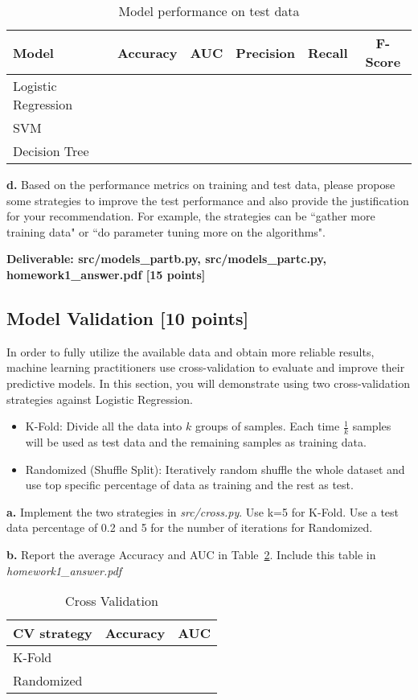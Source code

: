 \documentclass[12pt]{article}
\begin{document}
\begin{table}[h]
\centering
\begin{tabular}{@{}lccccc@{}}
\toprule
Model & Accuracy & AUC & Precision & Recall & F-Score  \\ \midrule
Logistic Regression & & & & &\\
SVM & & & & &\\
Decision Tree & & & & &\\
\bottomrule
\end{tabular}
\caption{Model performance on test data}
\label{tbl:modelc}
\end{table}

\textbf{d.}  Based on the performance metrics on training and test data,  please propose some strategies to improve the test performance and also provide the justification for your recommendation. For example, the strategies can be ``gather more training data" or ``do parameter tuning more on the algorithms". 

\textbf{Deliverable: src/models\_partb.py, src/models\_partc.py, homework1\_answer.pdf [15 points]}

\subsection{Model Validation [10 points]}
In order to fully utilize the available data and obtain more reliable results, machine learning practitioners use cross-validation to evaluate and improve their predictive models. In this section, you will demonstrate using two cross-validation strategies against Logistic Regression. 

\begin{itemize}
\item K-Fold: Divide all the data into $k$ groups of samples. Each time $\frac{1}{k}$ samples will be used as test data and the remaining samples as training data.
\item Randomized (Shuffle Split): Iteratively random shuffle the whole dataset and use top specific percentage of data as training and the rest as test. 
\end{itemize}

\textbf{a.} Implement the two strategies in \textit{src/cross.py}. Use k=5 for K-Fold. Use a test data percentage of 0.2 and 5 for the number of iterations for Randomized.

\textbf{b.} Report the average Accuracy and AUC in Table~\ref{tbl:cv}. Include this table in \textit{homework1\_answer.pdf}\\
\begin{table}[h]
\centering
\begin{tabular}{@{}lcc@{}}
\toprule
CV strategy & Accuracy & AUC  \\ \midrule
K-Fold & & \\
Randomized & & \\
\bottomrule
\end{tabular}
\caption{Cross Validation}
\label{tbl:cv}
\end{table} 
\end{document}
